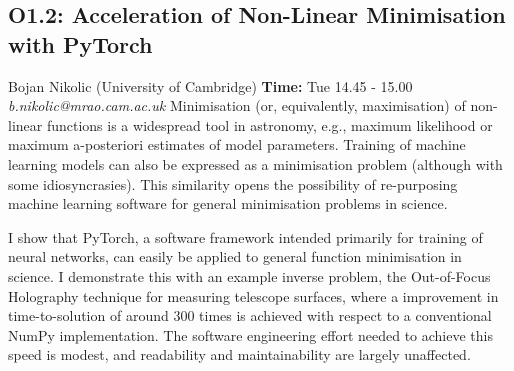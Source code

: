 \documentclass{report}
\begin{document}
\subsection*{O1.2: Acceleration of Non-Linear Minimisation with PyTorch}
\bigskip
Bojan Nikolic (University of Cambridge) \newline   \newline   \newline   \newline  \newline  \newline\newline
{\bf Time:} Tue 14.45 - 15.00\newline
\newline
{\it b.nikolic@mrao.cam.ac.uk}\newline
\newline\newline
Minimisation (or, equivalently, maximisation) of non-linear functions
is a widespread tool in astronomy, e.g., maximum likelihood or maximum
a-posteriori estimates of model parameters. Training of machine
learning models can also be expressed as a minimisation problem
(although with some idiosyncrasies). This similarity opens the
possibility of re-purposing machine learning software for general
minimisation problems in science.

I show that PyTorch, a software framework intended primarily for
training of neural networks, can easily be applied to general function
minimisation in science. I demonstrate this with an example inverse
problem, the Out-of-Focus Holography technique for measuring
telescope surfaces, where a improvement in time-to-solution of around
300 times is achieved with respect to a conventional NumPy
implementation. The software engineering effort needed to achieve this
speed is modest, and readability and maintainability are largely
unaffected.\newline
\newpage
\end{document}
